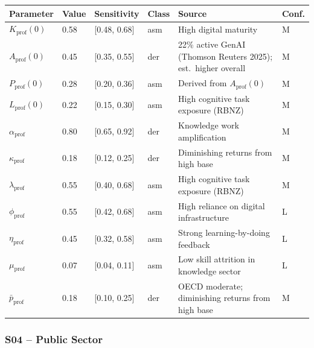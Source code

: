 \documentclass[11pt,a4paper]{article}
\begin{document}
\begin{center}
\begin{tabular}{llllll}
\toprule
Parameter & Value & Sensitivity & Class & Source & Conf.\\
\midrule
$K_{\text{prof}}(0)$ & 0.58 & [0.48, 0.68] & asm & High digital maturity & M \\
$A_{\text{prof}}(0)$ & 0.45 & [0.35, 0.55] & der & 22\% active GenAI (Thomson Reuters 2025); est.\ higher overall & M \\
$P_{\text{prof}}(0)$ & 0.28 & [0.20, 0.36] & asm & Derived from $A_{\text{prof}}(0)$ & M \\
$L_{\text{prof}}(0)$ & 0.22 & [0.15, 0.30] & asm & High cognitive task exposure (RBNZ) & M \\
$\alpha_{\text{prof}}$ & 0.80 & [0.65, 0.92] & der & Knowledge work amplification & M \\
$\kappa_{\text{prof}}$ & 0.18 & [0.12, 0.25] & der & Diminishing returns from high base & M \\
$\lambda_{\text{prof}}$ & 0.55 & [0.40, 0.68] & asm & High cognitive task exposure (RBNZ) & M \\
$\phi_{\text{prof}}$ & 0.55 & [0.42, 0.68] & asm & High reliance on digital infrastructure & L \\
$\eta_{\text{prof}}$ & 0.45 & [0.32, 0.58] & asm & Strong learning-by-doing feedback & L \\
$\mu_{\text{prof}}$ & 0.07 & [0.04, 0.11] & asm & Low skill attrition in knowledge sector & L \\
$\bar{p}_{\text{prof}}$ & 0.18 & [0.10, 0.25] & der & OECD moderate; diminishing returns from high base & M \\
\bottomrule
\end{tabular}
\end{center}

\subsubsection*{S04 -- Public Sector}
\end{document}
